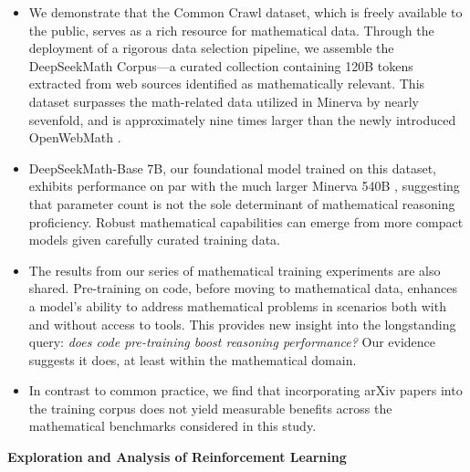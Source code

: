 \begin{itemize}[topsep=0pt]
    \item We demonstrate that the Common Crawl dataset, which is freely available to the public, serves as a rich resource for mathematical data. Through the deployment of a rigorous data selection pipeline, we assemble the DeepSeekMath Corpus—a curated collection containing 120B tokens extracted from web sources identified as mathematically relevant. This dataset surpasses the math-related data utilized in Minerva \citep{minerva} by nearly sevenfold, and is approximately nine times larger than the newly introduced OpenWebMath \citep{openwebmath}.

    \item DeepSeekMath-Base 7B, our foundational model trained on this dataset, exhibits performance on par with the much larger Minerva 540B \citep{minerva}, suggesting that parameter count is not the sole determinant of mathematical reasoning proficiency. Robust mathematical capabilities can emerge from more compact models given carefully curated training data.

    \item The results from our series of mathematical training experiments are also shared. Pre-training on code, before moving to mathematical data, enhances a model’s ability to address mathematical problems in scenarios both with and without access to tools. This provides new insight into the longstanding query: \textit{does code pre-training boost reasoning performance?} Our evidence suggests it does, at least within the mathematical domain.

    \item In contrast to common practice, we find that incorporating arXiv papers into the training corpus does not yield measurable benefits across the mathematical benchmarks considered in this study.
\end{itemize}

\textbf{Exploration and Analysis of Reinforcement Learning}

